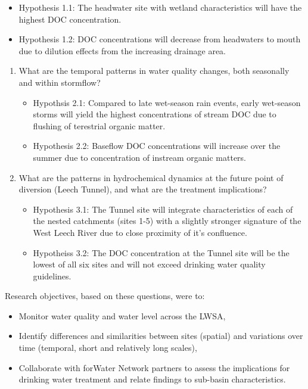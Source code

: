 \documentclass[]{article}
\providecommand{\tightlist}{%
  \setlength{\itemsep}{0pt}\setlength{\parskip}{0pt}}
\begin{document}
\begin{itemize}
\tightlist
\item
  Hypothesis 1.1: The headwater site with wetland characteristics will
  have the highest DOC concentration.
\item
  Hypothesis 1.2: DOC concentrations will decrease from headwaters to
  mouth due to dilution effects from the increasing drainage area.
\end{itemize}

\begin{enumerate}
\def\labelenumi{\arabic{enumi}.}
\setcounter{enumi}{1}
\tightlist
\item
  What are the temporal patterns in water quality changes, both
  seasonally and within stormflow?

  \begin{itemize}
  \tightlist
  \item
    Hypothsis 2.1: Compared to late wet-season rain events, early
    wet-season storms will yield the highest concentrations of stream
    DOC due to flushing of terestrial organic matter.
  \item
    Hypothesis 2.2: Baseflow DOC concentrations will increase over the
    summer due to concentration of instream organic matters.
  \end{itemize}
\item
  What are the patterns in hydrochemical dynamics at the future point of
  diversion (Leech Tunnel), and what are the treatment implications?

  \begin{itemize}
  \tightlist
  \item
    Hypothesis 3.1: The Tunnel site will integrate characteristics of
    each of the nested catchments (sites 1-5) with a slightly stronger
    signature of the West Leech River due to close proximity of it's
    confluence.
  \item
    Hypotheiss 3.2: The DOC concentration at the Tunnel site will be the
    lowest of all six sites and will not exceed drinking water quality
    guidelines.
  \end{itemize}
\end{enumerate}

Research objectives, based on these questions, were to:

\begin{itemize}
\tightlist
\item
  Monitor water quality and water level across the LWSA,\\
\item
  Identify differences and similarities between sites (spatial) and
  variations over time (temporal, short and relatively long scales),
\item
  Collaborate with forWater Network partners to assess the implications
  for drinking water treatment and relate findings to sub-basin
  characteristics.
\end{itemize}
\end{document}

